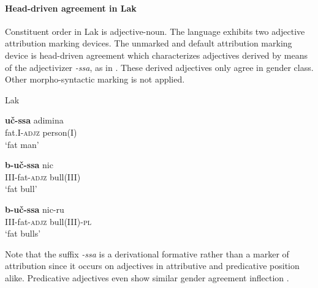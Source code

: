 \paragraph*{Head\hyp{}driven agreement in Lak}
Constituent order in Lak is adjective-noun. The language exhibits two adjective attribution marking devices. The unmarked and default attribution marking device is head\hyp{}driven agreement which characterizes adjectives derived by means of the adjectivizer \mbox{\textit{-ssa}}, as in . These derived adjectives only agree in gender class. Other morpho-syntactic marking is not applied.
\begin{exe}
\ex 
\label{lak hdragr}
{\rm Lak \citep[48]{zirkov1955}} 
\begin{xlist}
\ex 
\gll	\textbf{uč-ssa} adimina\\
	fat.\textsc{I}-\textsc{adjz} person(\textsc{I})\\
\glt	‘fat man’

\ex
\gll	\textbf{b-uč-ssa} nic\\
	\textsc{III}-fat-\textsc{adjz} bull\textsc{(III)}\\
\glt	‘fat bull’

\ex
\gll	\textbf{b-uč-ssa} nic-ru\\
	\textsc{III}-fat-\textsc{adjz} bull\textsc{(III)}-\textsc{pl}\\
\glt	‘fat bulls’
\end{xlist}
\end{exe}
Note that the suffix \textit{-ssa} is a derivational formative rather than a marker of attribution since it occurs on adjectives in attributive and predicative position alike. Predicative adjectives even show similar gender agreement inflection \citep[45–51]{zirkov1955}.

